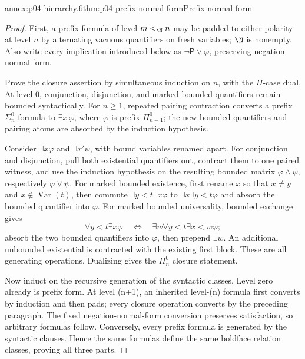 \begin{annexitem}{annex:p04-hierarchy.6}{thm:p04-prefix-normal-form}{Prefix normal form}
\begin{proof}
First, a prefix formula of level \(m<_{\N}n\) may be padded to either polarity at
level \(n\) by alternating vacuous quantifiers on fresh variables; \(\N\) is
nonempty.  Also write every implication introduced below as
\(\neg\mathsf P\lor\varphi\), preserving negation normal form.

Prove the closure assertion by simultaneous induction on \(n\), with the
\(\Pi\)-case dual.  At level \(0\), conjunction, disjunction, and marked
bounded quantifiers remain bounded syntactically.  For \(n\geq1\), repeated
pairing contraction converts a prefix \(\Sigma^0_n\)-formula to
\(\exists x\,\varphi\), where \(\varphi\) is prefix
\(\Pi^0_{n-1}\); the new bounded
quantifiers and pairing atoms are absorbed by the induction hypothesis.

Consider \(\exists x\varphi\) and \(\exists x'\psi\), with bound variables renamed
apart.  For conjunction and disjunction, pull both existential quantifiers
out, contract them to one paired witness, and use the induction hypothesis on
the resulting bounded matrix \(\varphi\land\psi\), respectively
\(\varphi\lor\psi\).
For marked bounded existence, first rename \(x\) so that \(x\ne y\) and
\(x\notin\operatorname{Var}(t)\), then commute
\(\exists y<t\exists x\varphi\) to \(\exists x\exists y<t\varphi\) and absorb the
bounded quantifier into \(\varphi\).  For marked bounded universality, bounded
exchange gives
\[
 \forall y<t\exists x\varphi
 \quad\Leftrightarrow\quad
 \exists w\forall y<t\exists x<w\varphi;
\]
absorb the two bounded quantifiers into \(\varphi\), then prepend \(\exists w\).
An additional unbounded existential is contracted with the existing first
block.  These are all generating operations.  Dualizing gives the
\(\Pi^0_n\) closure statement.

Now induct on the recursive generation of the syntactic classes.  Level zero
already is prefix form.  At level (n+1), an inherited level-(n) formula
first converts by induction and then pads; every closure operation converts
by the preceding paragraph.  The fixed negation-normal-form conversion
preserves satisfaction, so arbitrary formulas follow.  Conversely, every
prefix formula is generated by the syntactic clauses.  Hence the same
formulas define the same boldface relation classes, proving all three parts.
\end{proof}
\end{annexitem}

